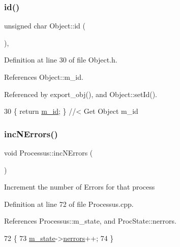 \subsubsection{\texorpdfstring{id()}{id()}}
{\footnotesize\ttfamily unsigned char Object\+::id (\begin{DoxyParamCaption}{ }\end{DoxyParamCaption})\hspace{0.3cm}{\ttfamily [inline]}, {\ttfamily [inherited]}}



Definition at line 30 of file Object.\+h.



References Object\+::m\+\_\+id.



Referenced by export\+\_\+obj(), and Object\+::set\+Id().


\begin{DoxyCode}
30 \{ \textcolor{keywordflow}{return} \hyperlink{classObject_aca74b9dbfed7b5556ea2d56c65b6b6b0}{m\_id};         \} \textcolor{comment}{//< Get Object m\_id }
\end{DoxyCode}
\mbox{\label{classProcessus_abe603d0636f76db6aa6c5c60cf34c591}} 
\subsubsection{\texorpdfstring{inc\+N\+Errors()}{incNErrors()}}
{\footnotesize\ttfamily void Processus\+::inc\+N\+Errors (\begin{DoxyParamCaption}{ }\end{DoxyParamCaption})\hspace{0.3cm}{\ttfamily [inherited]}}

Increment the number of Errors for that process 

Definition at line 72 of file Processus.\+cpp.



References Processus\+::m\+\_\+state, and Proc\+State\+::nerrors.


\begin{DoxyCode}
72                            \{
73   \hyperlink{classProcessus_ab3539eee42891ceae0baf4395ae7fb61}{m\_state}->\hyperlink{structProcState_a51a0f54ba62b07e07ac8518c5f32828d}{nerrors}++;
74 \}
\end{DoxyCode}
\mbox{\label{classObject_a644fd329ea4cb85f54fa6846484b84a8}} 

